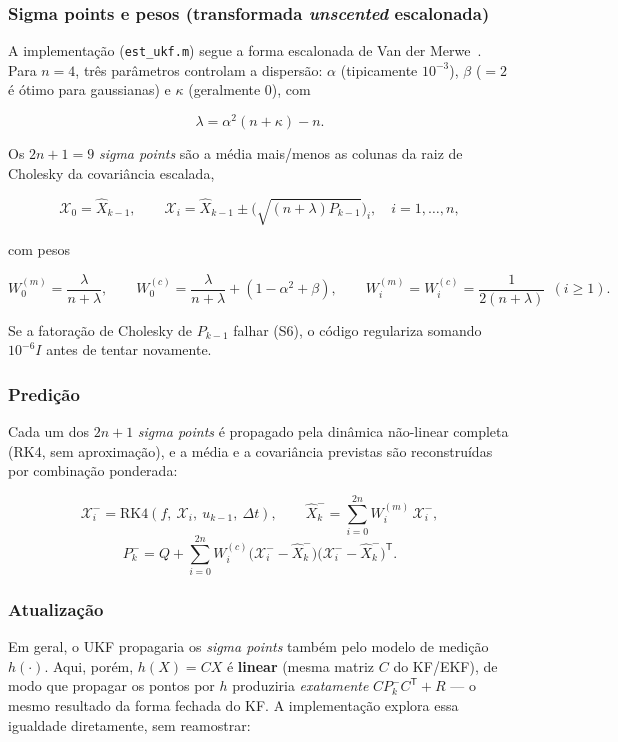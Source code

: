 \documentclass[brazil, 12pt]{article}
\begin{document}
\subsubsection{Sigma points e pesos (transformada \emph{unscented} escalonada)}

A implementação (\texttt{est\_ukf.m}) segue a forma escalonada de Van der
Merwe~\cite{wan2000}. Para $n=4$, três parâmetros controlam a dispersão:
$\alpha$ (tipicamente $10^{-3}$), $\beta$ ($=2$ é ótimo para gaussianas) e
$\kappa$ (geralmente $0$), com

\[
\lambda = \alpha^2(n+\kappa) - n.
\]

Os $2n+1=9$ \emph{sigma points} são a média mais/menos as colunas da raiz de
Cholesky da covariância escalada,

\[
\mathcal{X}_0 = \hat X_{k-1},
\qquad
\mathcal{X}_i = \hat X_{k-1} \pm \Big(\sqrt{(n+\lambda)P_{k-1}}\Big)_i,
\quad i=1,\dots,n,
\]

com pesos

\[
W_0^{(m)} = \frac{\lambda}{n+\lambda}, \qquad
W_0^{(c)} = \frac{\lambda}{n+\lambda} + (1-\alpha^2+\beta), \qquad
W_i^{(m)} = W_i^{(c)} = \frac{1}{2(n+\lambda)}\ \ (i\geq1).
\]

Se a fatoração de Cholesky de $P_{k-1}$ falhar (S6), o código regulariza
somando $10^{-6}I$ antes de tentar novamente.

\subsubsection{Predição}

Cada um dos $2n+1$ \emph{sigma points} é propagado pela dinâmica não-linear
completa (RK4, sem aproximação), e a média e a covariância previstas são
reconstruídas por combinação ponderada:

\[
\mathcal{X}_i^{-} = \mathrm{RK4}(f,\ \mathcal{X}_i,\ u_{k-1},\ \Delta t),
\qquad
\hat X_k^{-} = \sum_{i=0}^{2n} W_i^{(m)}\,\mathcal{X}_i^{-},
\]
\[
P_k^{-} = Q + \sum_{i=0}^{2n} W_i^{(c)}\big(\mathcal{X}_i^{-}-\hat X_k^{-}\big)\big(\mathcal{X}_i^{-}-\hat X_k^{-}\big)^{\mathsf T}.
\]

\subsubsection{Atualização}

Em geral, o UKF propagaria os \emph{sigma points} também pelo modelo de
medição $h(\cdot)$. Aqui, porém, $h(X)=CX$ é \textbf{linear} (mesma matriz
$C$ do KF/EKF), de modo que propagar os pontos por $h$ produziria
\emph{exatamente} $C P_k^{-} C^{\mathsf T}+R$ — o mesmo resultado da forma
fechada do KF. A implementação explora essa igualdade diretamente, sem
reamostrar:
\end{document}
